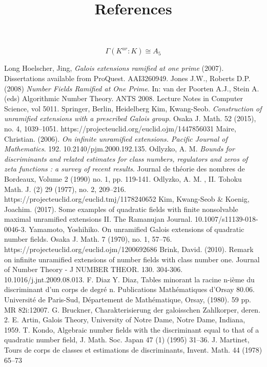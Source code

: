 \documentclass[preprint,12pt,reqno]{elsarticle}
\begin{document}
\begin{equation}
    \Gamma(K^{ur}:K)\cong A_{5}
\end{equation}
\begin{thebibliography}{9}
\title{References}
Long Hoelscher, Jing, \textit{Galois extensions ramified at one prime} (2007). Dissertations available from ProQuest. AAI3260949. 
Jones J.W., Roberts D.P. (2008) \textit{Number Fields Ramified at One Prime}. In: van der Poorten A.J., Stein A. (eds) Algorithmic Number Theory. ANTS 2008. Lecture Notes in Computer Science, vol 5011. Springer, Berlin, Heidelberg
Kim, Kwang-Seob. \textit{Construction of unramified extensions with a prescribed Galois group}. Osaka J. Math. 52 (2015), no. 4, 1039--1051. https://projecteuclid.org/euclid.ojm/1447856031
Maire, Christian. (2006). \textit{On infinite unramified extensions. Pacific Journal of Mathematics}. 192. 10.2140/pjm.2000.192.135. 
Odlyzko, A. M. \textit{Bounds for discriminants and related estimates for class numbers, regulators and zeros of zeta functions : a survey of recent results}. Journal de théorie des nombres de Bordeaux, Volume 2 (1990) no. 1, pp. 119-141. 
Odlyzko, A. M. , II. Tohoku Math. J. (2) 29 (1977), no. 2, 209--216.  https://projecteuclid.org/euclid.tmj/1178240652
Kim, Kwang-Seob & Koenig, Joachim. (2017). Some examples of quadratic fields with finite nonsolvable maximal unramified extensions II. The Ramanujan Journal. 10.1007/s11139-018-0046-3. 
Yamamoto, Yoshihiko. On unramified Galois extensions of quadratic number fields. Osaka J. Math. 7 (1970), no. 1, 57--76. https://projecteuclid.org/euclid.ojm/1200692686
Brink, David. (2010). Remark on infinite unramified extensions of number fields with class number one. Journal of Number Theory - J NUMBER THEOR. 130. 304-306. 10.1016/j.jnt.2009.08.013. 
 F. Diaz Y. Diaz, Tables minorant la racine n-ième du discriminant d'un corps de degré n. Publications Mathématiques d'Orsay 80.06. Université de Paris-Sud, Département de Mathématique, Orsay, (1980). 59 pp. MR 82i:12007.
 G. Bruckner, Charakterisierung der galoisschen Zahlkorper, deren. 2. E. Artin, Galois Theory, University of Notre Dame, Notre Dame, Indiana, 1959.
 T. Kondo, Algebraic number fields with the discriminant equal to that of a quadratic number field, J. Math. Soc. Japan 47 (1)
(1995) 31–36.
 J. Martinet, Tours de corps de classes et estimations de discriminants, Invent. Math. 44 (1978) 65–73

\end{thebibliography}
\end{document}
